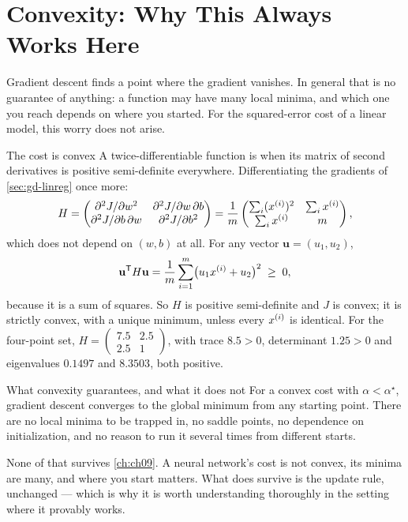 \section{Convexity: Why This Always Works Here}
\label{sec:convexity}

Gradient descent finds a point where the gradient vanishes. In general that is
no guarantee of anything: a function may have many local minima, and which one
you reach depends on where you started. For the squared-error cost of a linear
model, this worry does not arise.

\begin{derivation}{The cost is convex}
A twice-differentiable function is  when its matrix of second
derivatives is positive semi-definite everywhere. Differentiating the gradients
of \cref{sec:gd-linreg} once more:
\[
  H = \begin{pmatrix}
        \partial^2 J/\partial w^2 & \partial^2 J/\partial w\,\partial b\\
        \partial^2 J/\partial b\,\partial w & \partial^2 J/\partial b^2
      \end{pmatrix}
    = \frac1m\begin{pmatrix}\sum_i (x^{(i)})^2 & \sum_i x^{(i)}\\
                            \sum_i x^{(i)} & m\end{pmatrix},
\]
which does not depend on $(w,b)$ at all. For any vector $\mathbf{u} = (u_1,u_2)$,
\[
  \mathbf{u}^{\mathsf{T}} H \mathbf{u}
    = \frac1m\sum_{i=1}^{m}\bigl(u_1x^{(i)} + u_2\bigr)^2 \;\ge\; 0,
\]
because it is a sum of squares. So $H$ is positive semi-definite and $J$ is
convex; it is strictly convex, with a unique minimum, unless every $x^{(i)}$ is
identical. For the four-point set, $H = \left(\begin{smallmatrix}7.5 & 2.5\\ 2.5
& 1\end{smallmatrix}\right)$, with trace $8.5>0$, determinant $1.25>0$ and
eigenvalues $0.1497$ and $8.3503$, both positive.
\end{derivation}

\begin{keyinsight}{What convexity guarantees, and what it does not}
For a convex cost with $\alpha < \alpha^\star$, gradient descent converges to the
global minimum from any starting point. There are no local minima to be trapped
in, no saddle points, no dependence on initialization, and no reason to run it
several times from different starts.

None of that survives \cref{ch:ch09}. A neural network's cost is not convex, its
minima are many, and where you start matters. What does survive is the update
rule, unchanged --- which is why it is worth understanding thoroughly in the
setting where it provably works.
\end{keyinsight}


